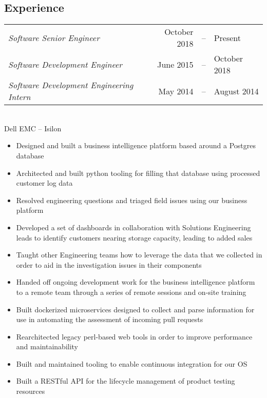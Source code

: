 \documentclass[line,margin]{res}
\begin{document}
\begin{resume}
  \section{\textcolor{TealBlue}{Experience}} 
    \begin{tabular}{@{} p{} r c l @{}}
      {\sl Software Senior Engineer\/} & October 2018 & -- & Present \\%
      {\sl Software Development Engineer\/} & June 2015 & -- & October 2018 \\%
      {\sl Software Development Engineering Intern\/} & May 2014 & -- & August 2014 \\%
    \end{tabular} \\
      Dell EMC -- Isilon %
      \begin{itemize} 
	\setlength{\itemsep}{-2pt}
        \item Designed and built a business intelligence platform based around a Postgres database
        \item Architected and built python tooling for filling that database using processed customer log data
        \item Resolved engineering questions and triaged field issues using our business platform
        \item Developed a set of dashboards in collaboration with Solutions Engineering leads to identify customers nearing storage capacity, leading to added sales
        \item Taught other Engineering teams how to leverage the data that we collected in order to aid in the investigation issues in their components
        \item Handed off ongoing development work for the business intelligence platform to a remote team through a series of remote sessions and on-site training
	\item Built dockerized microservices designed to collect and parse information for use in automating the assessment of incoming pull requests
	\item Rearchitected legacy perl-based web tools in order to improve performance and maintainability
	\item Built and maintained tooling to enable continuous integration for our OS
	\item Built a RESTful API for the lifecycle management of product testing resources
      \end{itemize}


\end{resume}
\end{document}
